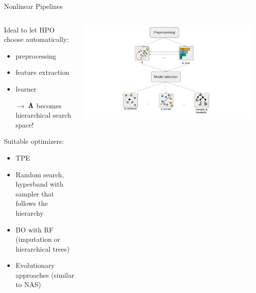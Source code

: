 \begin{frame}{Nonlinear Pipelines}

  \begin{columns}
    \begin{column}{0.6\textwidth}
      Ideal to let HPO choose automatically:
      \begin{itemize}
      \item preprocessing
      \item feature extraction   
      \item learner
      \item[$\rightarrow$] $\pmb{\Lambda}$ becomes hierarchical search space!
      \end{itemize}
      
      \vspace*{0.5em}

      Suitable optimizers:
      \begin{itemize}
        \item TPE
        \item Random search, hyperband with sampler that follows the hierarchy
        \item BO with RF (imputation or hierarchical trees)
        \item Evolutionary approaches (similar to NAS)
      \end{itemize}

    \end{column}%
    \begin{column}{0.4\textwidth}
      \begin{center}
        \includegraphics[width = \textwidth, trim=160 0 160 5, clip]{images/dag.pdf}
      \end{center}
    \end{column}
  \end{columns}
\end{frame}


